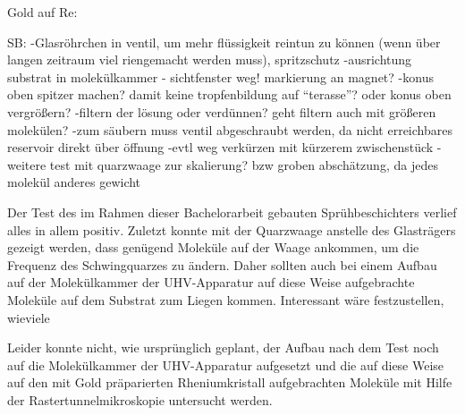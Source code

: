 Gold auf Re:





SB:
-Glasröhrchen in ventil, um mehr flüssigkeit reintun zu können (wenn über langen zeitraum viel riengemacht
werden muss), spritzschutz
-ausrichtung substrat in molekülkammer - sichtfenster weg! markierung an magnet?
-konus oben spitzer machen? damit keine tropfenbildung auf "`terasse"'? oder konus oben vergrößern?
-filtern der lösung oder verdünnen? geht filtern auch mit größeren molekülen?
-zum säubern muss ventil abgeschraubt werden, da nicht erreichbares reservoir direkt über öffnung
-evtl weg verkürzen mit kürzerem zwischenstück
-weitere test mit quarzwaage zur skalierung? bzw groben abschätzung, da jedes molekül anderes
gewicht



Der Test des im Rahmen dieser Bachelorarbeit gebauten Sprühbeschichters verlief alles in allem
positiv. Zuletzt konnte mit der Quarzwaage anstelle des Glasträgers gezeigt werden, dass genügend
Moleküle auf der Waage ankommen, um die Frequenz des Schwingquarzes zu ändern. Daher sollten auch
bei einem Aufbau auf der Molekülkammer der UHV-Apparatur auf diese Weise aufgebrachte Moleküle auf
dem Substrat zum Liegen kommen. Interessant wäre festzustellen, wieviele 

Leider konnte nicht, wie ursprünglich geplant, der Aufbau nach dem Test noch auf die Molekülkammer
der UHV-Apparatur aufgesetzt und die auf diese Weise auf den mit Gold präparierten Rheniumkristall
aufgebrachten Moleküle mit Hilfe der Rastertunnelmikroskopie untersucht werden.
